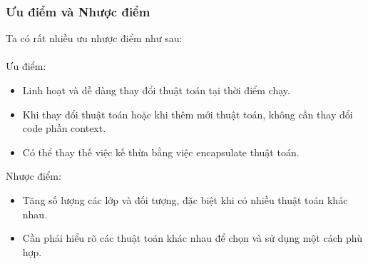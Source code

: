 \subsubsection{Ưu điểm và Nhược điểm}
Ta có rất nhiều ưu nhược điểm như sau:\\\\
Ưu điểm:
\begin{itemize}
    \item Linh hoạt và dễ dàng thay đổi thuật toán tại thời điểm chạy.
    \item Khi thay đổi thuật toán hoặc khi thêm mới thuật toán, không cần thay đổi code phần context.
    \item Có thể thay thế việc kế thừa bằng việc encapsulate thuật toán.
\end{itemize}
Nhược điểm:
\begin{itemize}
    \item Tăng số lượng các lớp và đối tượng, đặc biệt khi có nhiều thuật toán khác nhau.
    \item Cần phải hiểu rõ các thuật toán khác nhau để chọn và sử dụng một cách phù hợp.
\end{itemize}
